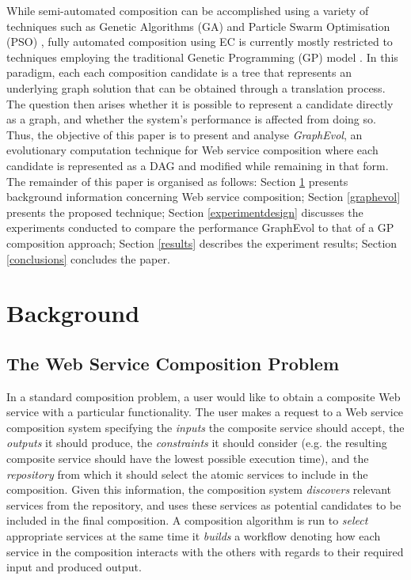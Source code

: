 \documentclass{article}
\begin{document}
While semi-automated composition can be accomplished using a variety of techniques such as Genetic Algorithms (GA) and Particle Swarm Optimisation
(PSO) \cite{}, fully automated composition using EC is currently mostly restricted to techniques employing the traditional Genetic Programming (GP) model \cite{rodriguez2010composition}.
In this paradigm, each each composition candidate is a tree that represents an underlying graph solution that can be obtained through a translation
process. The question then arises whether it is possible to represent a candidate directly as a graph, and whether the system's performance is affected
from doing so. Thus, the objective of this paper is to present and analyse \textit{GraphEvol}, an evolutionary computation technique for Web service
composition where each candidate is represented as a DAG and modified while remaining in that form. The remainder of this paper is organised as follows:
Section \ref{background} presents background information concerning Web service composition; Section \ref{graphevol} presents the proposed technique;
Section \ref{experimentdesign} discusses the experiments conducted to compare the performance GraphEvol to that of a GP composition approach;
Section \ref{results} describes the experiment results; Section \ref{conclusions} concludes the paper.

\section{Background}\label{background}

\subsection{The Web Service Composition Problem}
In a standard composition problem, a user would like to obtain a composite Web service with a particular functionality. The user makes a request to a Web
service composition system specifying the \textit{inputs} the composite service should accept, the \textit{outputs} it should produce, the \textit{constraints}
it should consider (e.g. the resulting composite service should have the lowest possible execution time), and the \textit{repository} from which it should select
the atomic services to include in the composition. Given this information, the composition system \textit{discovers} relevant services from the repository, and uses
these services as potential candidates to be included in the final composition. A composition algorithm is run to \textit{select} appropriate services at the same
time it \textit{builds} a workflow denoting how each service in the composition interacts with the others with regards to their required input and produced output.
\end{document}
